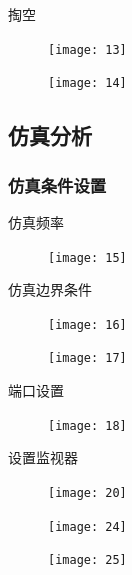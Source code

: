 \documentclass{../source/Experiment}
\begin{document}
            掏空
            \begin{figure}[H]
                \centering
                \texttt{[image: 13]}
                \caption{}
            \end{figure}
            \begin{figure}[H]
                \centering
                \texttt{[image: 14]}
                \caption{}
            \end{figure}

        \subsection{仿真分析}

            \subsubsection{仿真条件设置}
            仿真频率
            \begin{figure}[H]
                \centering
                \texttt{[image: 15]}
                \caption{}
            \end{figure}
            仿真边界条件
            \begin{figure}[H]
                \centering
                \texttt{[image: 16]}
                \caption{}
            \end{figure}
            
            \begin{figure}[H]
                \centering
                \texttt{[image: 17]}
                \caption{}
            \end{figure}

            端口设置
            \begin{figure}[H]
                \centering
                \texttt{[image: 18]}
                \caption{}
            \end{figure}
            设置监视器
            
            \begin{figure}[H]
                \centering
                \texttt{[image: 20]}
                \caption{}
            \end{figure}
            \begin{figure}[H]
                \centering
                \texttt{[image: 24]}
                \caption{}
            \end{figure}
            \begin{figure}[H]
                \centering
                \texttt{[image: 25]}
                \caption{}
            \end{figure}
            
\end{document}
